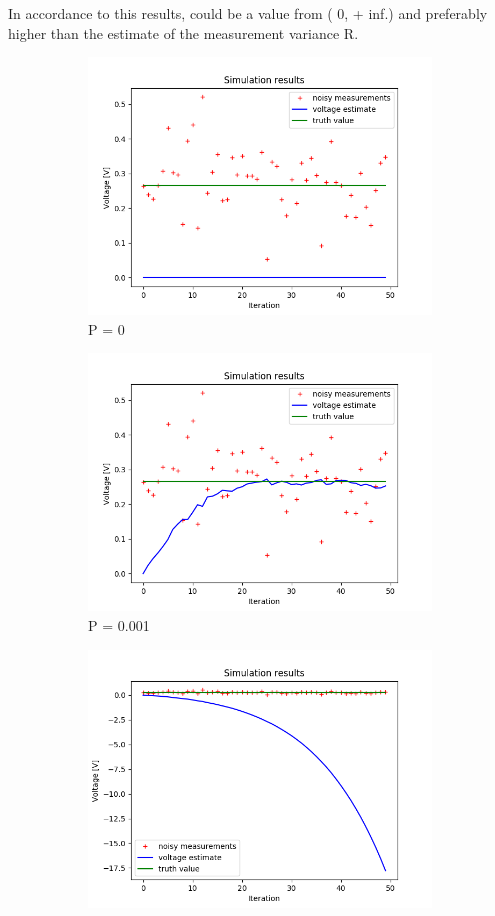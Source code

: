 \documentclass{article}
\begin{document}
    In accordance to this results, could be a value from ( 0, + inf.) and preferably higher than the estimate of
    the measurement variance R.

    \begin{figure}
        \begin{subfigure} {.3\textwidth}  
            \centering 
            \includegraphics[width=0.8\linewidth]{./img/P0_.png}
            \caption{P = 0 }
        \end{subfigure}
        \begin{subfigure}{.3\textwidth}            
            \centering
            \includegraphics[width=0.8\linewidth]{./img/P001_.png}
            \caption{P = 0.001}
        \end{subfigure}    
        \begin{subfigure} {.3\textwidth}         
            \centering
            \includegraphics[width=0.8\linewidth]{./img/Pneg.png}

\end{subfigure}
\end{figure}
\end{document}
